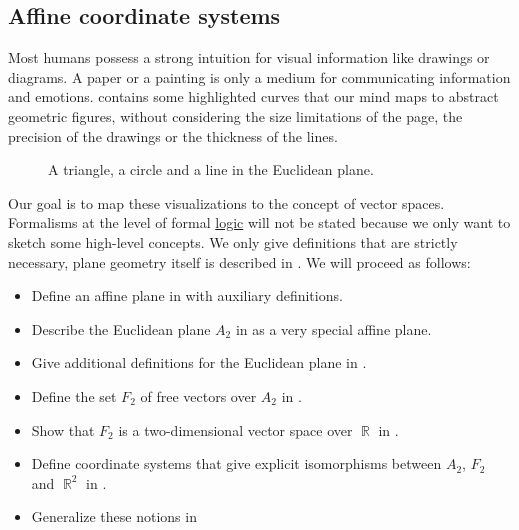 \subsection{Affine coordinate systems}\label{subsec:affine_coordinate_system}

\begin{remark}\label{rem:affine_coordinate_system_concept}
  Most humans possess a strong intuition for visual information like drawings or diagrams. A paper or a painting is only a medium for communicating information and emotions.  contains some highlighted curves that our mind maps to abstract geometric figures, without considering the size limitations of the page, the precision of the drawings or the thickness of the lines.

  \begin{figure}[b]
    \centering
    \iffalse\begin{mplibcode}
      u := 1cm;

      beginfig(1);
      draw (0, -1) * u -- (3, 0) * u;
      draw (-1, 2) * u -- (3, 1) * u -- (1, 3) * u -- cycle;
      draw fullcircle scaled 1.5u shifted ((0, 0.5) * u);
      endfig;
    \end{mplibcode}\fi
    \caption{A triangle, a circle and a line in the Euclidean plane.}\label{def:euclidean_plane/figures}
  \end{figure}

  Our goal is to map these visualizations to the concept of vector spaces. Formalisms at the level of formal \hyperref[def:first_order_language]{logic} will not be stated because we only want to sketch some high-level concepts. We only give definitions that are strictly necessary, plane geometry itself is described in . We will proceed as follows:

  \begin{itemize}
    \item Define an affine plane in  with auxiliary definitions.
    \item Describe the Euclidean plane \( A_2 \) in  as a very special affine plane.
    \item Give additional definitions for the Euclidean plane in .
    \item Define the set \( F_2 \) of free vectors over \( A_2 \) in .
    \item Show that \( F_2 \) is a two-dimensional vector space over \( \BbbR \) in .
    \item Define coordinate systems that give explicit isomorphisms between \( A_2 \), \( F_2 \) and \( \BbbR^2 \) in .
    \item Generalize these notions in 
  \end{itemize}
\end{remark}

